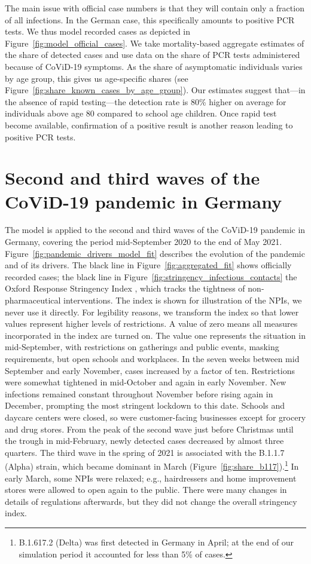 The main issue with official case numbers is that they will contain only a fraction of
all infections. In the German case, this specifically amounts to positive PCR tests. We
thus model recorded cases as depicted in Figure~\ref{fig:model_official_cases}. We take
mortality-based aggregate estimates of the share of detected cases and use data on the
share of PCR tests administered because of CoViD-19 symptoms. As the share of
asymptomatic individuals varies by age group, this gives us age-specific shares (see
Figure~\ref{fig:share_known_cases_by_age_group}). Our estimates suggest that---in the
absence of rapid testing---the detection rate is 80\% higher on average for individuals
above age 80 compared to school age children. Once rapid test become available,
confirmation of a positive result is another reason leading to positive PCR tests.

\section{Second and third waves of the CoViD-19 pandemic in Germany}

The model is applied to the second and third waves of the CoViD-19 pandemic in Germany,
covering the period mid-September 2020 to the end of May 2021.
Figure~\ref{fig:pandemic_drivers_model_fit} describes the evolution of the pandemic and
of its drivers. The black line in Figure~\ref{fig:aggregated_fit} shows officially
recorded cases; the black line in Figure~\ref{fig:stringency_infectious_contacts} the
Oxford Response Stringency Index \citep{Hale2020}, which tracks the tightness of
non-pharmaceutical interventions. The index is shown for illustration of the NPIs, we
never use it directly. For legibility reasons, we transform the index so that lower
values represent higher levels of restrictions. A value of zero means all measures
incorporated in the index are turned on. The value one represents the situation in
mid-September, with restrictions on gatherings and public events, masking requirements,
but open schools and workplaces. In the seven weeks between mid September and early
November, cases increased by a factor of ten. Restrictions were somewhat tightened in
mid-October and again in early November. New infections remained constant throughout
November before rising again in December, prompting the most stringent lockdown to this
date. Schools and daycare centers were closed, so were customer-facing businesses except
for grocery and drug stores. From the peak of the second wave just before Christmas
until the trough in mid-February, newly detected cases decreased by almost three
quarters. The third wave in the spring of 2021 is associated with the B.1.1.7 (Alpha)
strain, which became dominant in March (Figure~\ref{fig:share_b117}).\footnote{B.1.617.2
    (Delta) was first detected in Germany in April; at the end of our simulation period it
    accounted for less than 5\% of cases.} In early March, some NPIs were relaxed; e.g.,
hairdressers and home improvement stores were allowed to open again to the public. There
were many changes in details of regulations afterwards, but they did not change the
overall stringency index.

